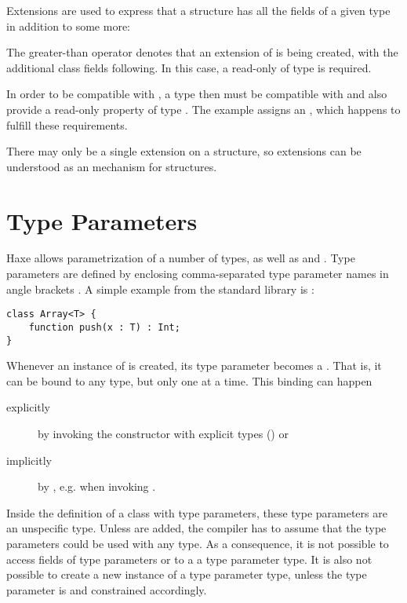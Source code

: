 \documentclass{haxe}
\begin{document}
Extensions are used to express that a structure has all the fields of a given type in addition to some more:

The greater-than operator \expr{>} denotes that an extension of  is being created, with the additional class fields following. In this case, a read-only   of type  is required.

In order to be compatible with , a type then must be compatible with  and also provide a read-only  property of type . The example assigns an , which happens to fulfill these requirements.

There may only be a single extension on a structure, so extensions can be understood as an  mechanism for structures.




\section{Type Parameters}
\label{type-system-type-parameters}

Haxe allows parametrization of a number of types, as well as  and . Type parameters are defined by enclosing comma-separated type parameter names in angle brackets \expr{$<>$}. A simple example from the standard library is :

\begin{lstlisting}
class Array<T> {
	function push(x : T) : Int;
}
\end{lstlisting}
Whenever an instance of  is created, its type parameter  becomes a . That is, it can be bound to any type, but only one at a time. This binding can happen

\begin{description}
	\item[explicitly] by invoking the constructor with explicit types () or
	\item[implicitly] by , e.g. when invoking .
\end{description}
Inside the definition of a class with type parameters, these type parameters are an unspecific type. Unless  are added, the compiler has to assume that the type parameters could be used with any type. As a consequence, it is not possible to access fields of type parameters or  to a a type parameter type. It is also not possible to create a new instance of a type parameter type, unless the type parameter is  and constrained accordingly. 
\end{document}
